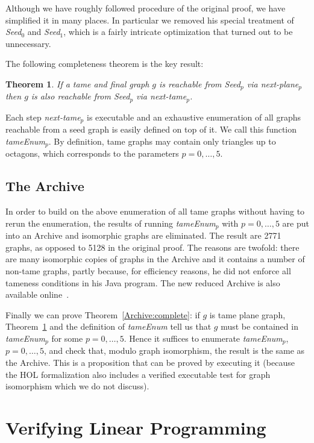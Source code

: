 \documentclass[11pt]{amsart}
\newtheorem{thm}[subsubsection]{Theorem}
\begin{document}
Although we have roughly followed procedure of the original proof, we have simplified it in
many places. In particular we removed his special treatment of
\textit{Seed$_0$} and \textit{Seed$_1$}, which is a fairly intricate
optimization that turned out to be unnecessary.

The following completeness theorem is the key result:
\begin{thm}\label{thm:TameEnum_comp}
If a tame and final graph $g$ is reachable from
\textit{Seed$_p$} via \textit{next-plane$_p$}
then $g$ is also reachable from \textit{Seed$_p$} via \textit{next-tame$_p$}.
\end{thm}

Each step \textit{next-tame$_p$} is executable and an exhaustive enumeration
of all graphs reachable from a seed graph is easily defined on top of it. We
call this function \textit{tameEnum$_p$}. By definition, tame graphs may
contain only triangles up to octagons, which corresponds to the parameters $p
= 0,\dots,5$.

\subsection*{The Archive}

In order to build on the above enumeration of all tame graphs without having
to rerun the enumeration, the results of running \textit{tameEnum$_p$} with
$p = 0,\dots,5$ are put into an Archive and isomorphic graphs are
eliminated. The result are 2771 graphs, as opposed to 5128 in the original proof. The
reasons are twofold: there are many isomorphic copies of graphs in the
Archive and it contains a number of non-tame graphs, partly because, for
efficiency reasons, he did not enforce all tameness conditions in his Java
program. The new reduced Archive is also available
online~\cite{BauerN-AFP06}.

Finally we can prove Theorem~\ref{Archive:complete}: if $g$ is tame plane
graph, Theorem~\ref{thm:TameEnum_comp} and the definition of
\textit{tameEnum} tell us that $g$ must be contained in \textit{tameEnum$_p$}
for some $p=0,\dots,5$. Hence it suffices to enumerate \textit{tameEnum$_p$},
$p=0,\dots,5$, and check that, modulo graph isomorphism, the result is the
same as the Archive. This is a proposition that can be proved by executing it
(because the HOL formalization also includes a verified executable test for
graph isomorphism which we do not discuss).




\section{Verifying Linear Programming}
\label{sec:lp}
\end{document}
